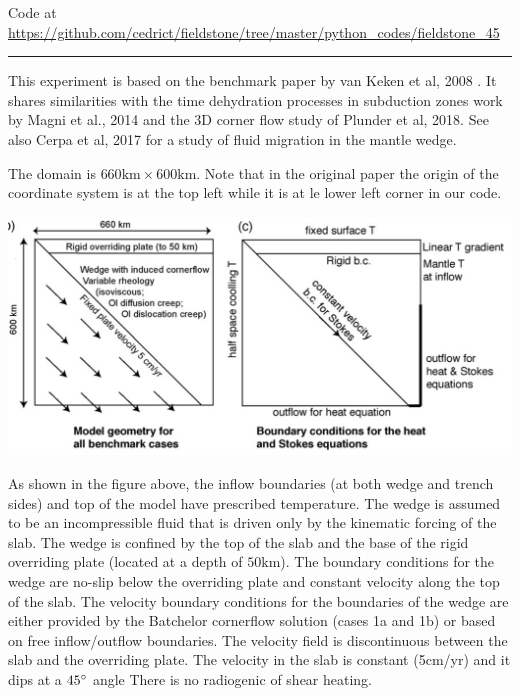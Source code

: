

\begin{center}
Code at \url{https://github.com/cedrict/fieldstone/tree/master/python_codes/fieldstone_45}
\end{center}

\par\noindent\rule{\textwidth}{0.4pt}

This experiment is based on the benchmark paper by van Keken et al, 2008 \cite{vack08}.
It shares similarities with the 
time dehydration processes in subduction zones work by Magni et al., 2014 \cite{mabv14} and 
the 3D corner flow study of Plunder et al, 2018\cite{pltv18}. See also Cerpa et al, 2017 \cite{ceww17}
for a study of fluid migration in the mantle wedge.

The domain is $660\text{km}\times 600\text{km}$. Note that in the original paper the 
origin of the coordinate system is at the top left while it is at le lower left corner 
in our code.

\begin{center}
\includegraphics[width=14cm]{python_codes/fieldstone_45/images/setup1}
\end{center}

As shown in the figure above, 
the inflow boundaries (at both wedge and trench sides) and top of the model 
have prescribed temperature. The wedge is assumed to be an incompressible fluid that
is driven only by the kinematic forcing of the slab. The wedge is
confined by the top of the slab and the base of the rigid overriding
plate (located at a depth of $50\text{km}$). 
The boundary conditions for the wedge are no-slip below the overriding plate and constant velocity
along the top of the slab. The velocity boundary conditions for the
boundaries of the wedge are either provided by the Batchelor cornerflow 
solution (cases 1a and 1b) or based on free inflow/outflow
boundaries. The velocity field is discontinuous between the slab
and the overriding plate.
The velocity in the slab is constant (5cm/yr) and it dips at a $45\degree$ angle
There is no radiogenic of shear heating.



